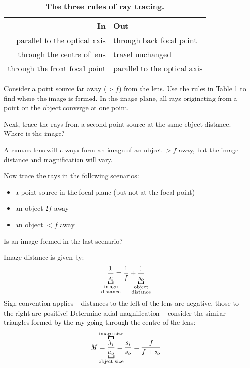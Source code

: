 \documentclass[a4paper]{report}
\newcommand{\nexercise}[0]{\arabic{exercises}\addtocounter{exercises}{1}}
\begin{document}
\begin{table}[!b]
\centering
\begin{tabularx}{0.8\textwidth}{r | l}
\toprule
\textbf{In} & \textbf{Out}
\\ \midrule
parallel to the optical axis & through back focal point \\
through the centre of lens & travel unchanged \\
through the front focal point & parallel to the optical axis \\
\bottomrule
\end{tabularx}
\label{tbl:rules}
\caption{
{\bf The three rules of ray tracing.}}
\end{table}

\begin{exercisebox}[frametitle={Exercise \nexercise: Image formation}]
Consider a point source far away ($>f$) from the lens. Use the rules in Table 1 to find where the image is formed. In the image plane, all rays originating from a point on the object converge at one point.

Next, trace the rays from a second point source at the same object distance. Where is the image?
\end{exercisebox}

A convex lens will always form an image of an object $>f$ away, but the image distance and magnification will vary.

\begin{exercisebox}[frametitle={Exercise \nexercise: Image formation}]
Now trace the rays in the following scenarios:
\begin{itemize}
	\item a point source in the focal plane (but not at the focal point)
	\item an object $2f$ away
	\item an object $<f$ away
\end{itemize}
Is an image formed in the last scenario?
\end{exercisebox}

Image distance is given by:
\begin{equation}
	\frac{1}{\underbracket{s_i}_{\mathclap{\substack{\text{image} \\ \text{distance}}}}} = 
	\frac{1}{f} + \frac{1}{\underbracket{s_o}_{\mathclap{\substack{\text{object} \\ \text{distance}}}}}
\end{equation}
Sign convention applies -- distances to the left of the lens are negative, those to the right are positive! Determine axial magnification -- consider the similar triangles formed by the ray going through the centre of the lens:
\begin{equation}
	M = \frac{\overbracket{h_i}^{\mathclap{\text{image size}}}}{\underbracket{h_o}_{\mathclap{\text{object size}}}} = \frac{s_i}{s_o} = \frac{f}{f + s_o}
\end{equation}
\end{document}
